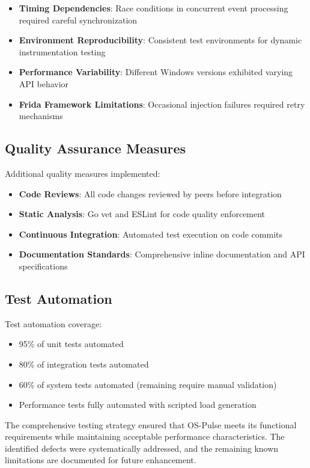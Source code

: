 \begin{itemize}
    \item \textbf{Timing Dependencies}: Race conditions in concurrent event processing required careful synchronization
    \item \textbf{Environment Reproducibility}: Consistent test environments for dynamic instrumentation testing
    \item \textbf{Performance Variability}: Different Windows versions exhibited varying API behavior
    \item \textbf{Frida Framework Limitations}: Occasional injection failures required retry mechanisms
\end{itemize}

\subsection{Quality Assurance Measures}

Additional quality measures implemented:

\begin{itemize}
    \item \textbf{Code Reviews}: All code changes reviewed by peers before integration
    \item \textbf{Static Analysis}: Go vet and ESLint for code quality enforcement
    \item \textbf{Continuous Integration}: Automated test execution on code commits
    \item \textbf{Documentation Standards}: Comprehensive inline documentation and API specifications
\end{itemize}

\subsection{Test Automation}

Test automation coverage:

\begin{itemize}
    \item 95\% of unit tests automated
    \item 80\% of integration tests automated
    \item 60\% of system tests automated (remaining require manual validation)
    \item Performance tests fully automated with scripted load generation
\end{itemize}

The comprehensive testing strategy ensured that OS-Pulse meets its functional requirements while maintaining acceptable performance characteristics. The identified defects were systematically addressed, and the remaining known limitations are documented for future enhancement.